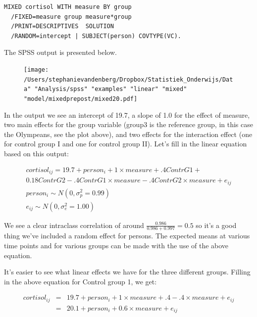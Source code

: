 \documentclass[]{report}\usepackage[]{graphicx}\usepackage[]{color}
\begin{document}
\begin{verbatim}
MIXED cortisol WITH measure BY group 
  /FIXED=measure group measure*group
  /PRINT=DESCRIPTIVES  SOLUTION
  /RANDOM=intercept | SUBJECT(person) COVTYPE(VC).
\end{verbatim}


The SPSS output is presented below. 


\begin{figure}[h]
    \begin{center}
       \texttt{[image: /Users/stephanievandenberg/Dropbox/Statistiek\_Onderwijs/Data" "Analysis/spss" "examples" "linear" "mixed" "model/mixedprepost/mixed20.pdf]}
    \end{center}
\end{figure}

In the output we see an intercept of 19.7, a slope of 1.0 for the effect of measure, two main effects for the group variable (group3 is the reference group, in this case the Olympeans, see the plot above), and two effects for the interaction effect (one for control group I and one for control group II). Let's fill in the linear equation based on this output:


\begin{eqnarray}
cortisol_{ij} = 19.7 + person_i + 1 \times measure + .4  ContrG1 + \nonumber\\
      0.18 ContrG2 -.4  ContrG1 \times measure -.4  ContrG2 \times measure+   e_{ij} \nonumber\\
person_i \sim N(0, \sigma_p^2 = 0.99)\nonumber\\
e_{ij} \sim N(0, \sigma_e^2 = 1.00) \nonumber
\end{eqnarray}

We see a clear intraclass correlation of around $\frac{0.986}{0.986+0.997}= 0.5 $ so it's a good thing we've included a random effect for persons. The expected means at various time points and for various groups can be made with the use of the above equation. 

It's easier to see what linear effects we have for the three different groups. Filling in the above equation for Control group 1, we get:

\begin{eqnarray}
cortisol_{ij} &=& 19.7 + person_i + 1 \times measure + .4    -.4  \times measure +   e_{ij} \nonumber \\
               &=&  20.1 + person_i +0.6 \times measure +   e_{ij} \nonumber
\end{eqnarray}
\end{document}
